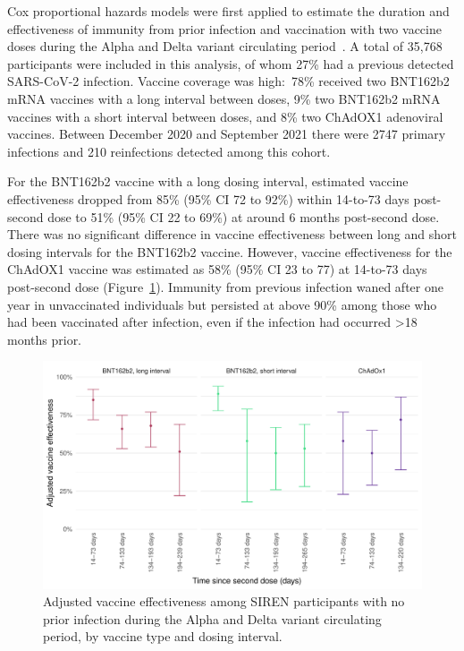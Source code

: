Cox proportional hazards models were first applied to estimate the duration and effectiveness of immunity from prior infection and vaccination with two vaccine doses during the Alpha and Delta variant circulating period~\parencite{Hall2022-ep}. A total of 35,768 participants were included in this analysis, of whom 27\% had a previous detected SARS-CoV-2 infection. Vaccine coverage was high:\ 78\% received two BNT162b2 mRNA vaccines with a long interval between doses, 9\% two BNT162b2 mRNA vaccines with a short interval between doses, and 8\% two ChAdOX1 adenoviral vaccines. Between December 2020 and September 2021 there were 2747 primary infections and 210 reinfections detected among this cohort.

For the BNT162b2 vaccine with a long dosing interval, estimated vaccine effectiveness dropped from 85\% (95\% CI 72 to 92\%) within 14-to-73 days post-second dose to 51\% (95\% CI 22 to 69\%) at around 6 months post-second dose. There was no significant difference in vaccine effectiveness between long and short dosing intervals for the BNT162b2 vaccine. However, vaccine effectiveness for the ChAdOX1 vaccine was estimated as 58\% (95\% CI 23 to 77) at 14-to-73 days post-second dose (Figure~\ref{fig:cox_1}). Immunity from previous infection waned after one year in unvaccinated individuals but persisted at above 90\% among those who had been vaccinated after infection, even if the infection had occurred >18 months prior.

\begin{figure}[htbp!]
    \centering
    \includegraphics[width=\textwidth]{cox_1.pdf}
    \caption[Adjusted vaccine effectiveness among SIREN participants with no prior infection during the Alpha and Delta variant circulating period]{Adjusted vaccine effectiveness among SIREN participants with no prior infection during the Alpha and Delta variant circulating period, by vaccine type and dosing interval.}\label{fig:cox_1}
\end{figure}

